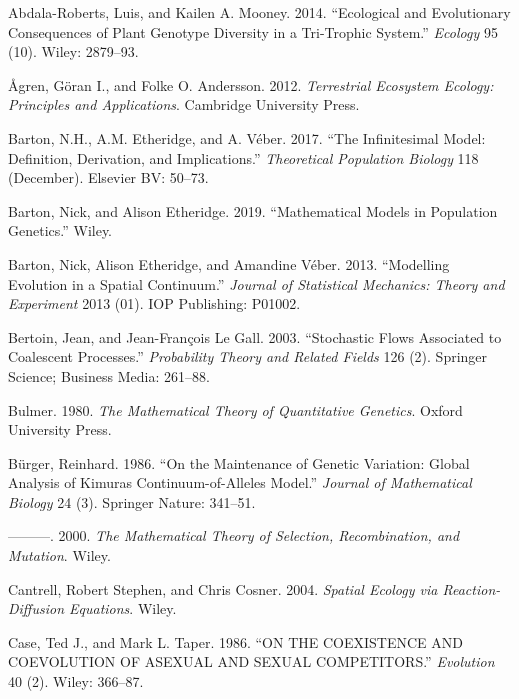 \documentclass[]{article}
\begin{document}
\hypertarget{refs}{}
\leavevmode\hypertarget{ref-AbdalaRoberts2014}{}%
Abdala-Roberts, Luis, and Kailen A. Mooney. 2014. ``Ecological and
Evolutionary Consequences of Plant Genotype Diversity in a Tri-Trophic
System.'' \emph{Ecology} 95 (10). Wiley: 2879--93.

\leavevmode\hypertarget{ref-9781107648258}{}%
Ågren, Göran I., and Folke O. Andersson. 2012. \emph{Terrestrial
Ecosystem Ecology: Principles and Applications}. Cambridge University
Press.

\leavevmode\hypertarget{ref-Barton2017}{}%
Barton, N.H., A.M. Etheridge, and A. Véber. 2017. ``The Infinitesimal
Model: Definition, Derivation, and Implications.'' \emph{Theoretical
Population Biology} 118 (December). Elsevier BV: 50--73.

\leavevmode\hypertarget{ref-Barton2019}{}%
Barton, Nick, and Alison Etheridge. 2019. ``Mathematical Models in
Population Genetics.'' Wiley.

\leavevmode\hypertarget{ref-Barton2013}{}%
Barton, Nick, Alison Etheridge, and Amandine Véber. 2013. ``Modelling
Evolution in a Spatial Continuum.'' \emph{Journal of Statistical
Mechanics: Theory and Experiment} 2013 (01). IOP Publishing: P01002.

\leavevmode\hypertarget{ref-Bertoin2003}{}%
Bertoin, Jean, and Jean-François Le Gall. 2003. ``Stochastic Flows
Associated to Coalescent Processes.'' \emph{Probability Theory and
Related Fields} 126 (2). Springer Science; Business Media: 261--88.

\leavevmode\hypertarget{ref-bulmer1980}{}%
Bulmer. 1980. \emph{The Mathematical Theory of Quantitative Genetics}.
Oxford University Press.

\leavevmode\hypertarget{ref-Brger1986}{}%
Bürger, Reinhard. 1986. ``On the Maintenance of Genetic Variation:
Global Analysis of Kimuras Continuum-of-Alleles Model.'' \emph{Journal
of Mathematical Biology} 24 (3). Springer Nature: 341--51.

\leavevmode\hypertarget{ref-9780471986539}{}%
---------. 2000. \emph{The Mathematical Theory of Selection,
Recombination, and Mutation}. Wiley.

\leavevmode\hypertarget{ref-Cantrell2004}{}%
Cantrell, Robert Stephen, and Chris Cosner. 2004. \emph{Spatial Ecology
via Reaction-Diffusion Equations}. Wiley.

\leavevmode\hypertarget{ref-Case1986}{}%
Case, Ted J., and Mark L. Taper. 1986. ``ON THE COEXISTENCE AND
COEVOLUTION OF ASEXUAL AND SEXUAL COMPETITORS.'' \emph{Evolution} 40
(2). Wiley: 366--87.
\end{document}
